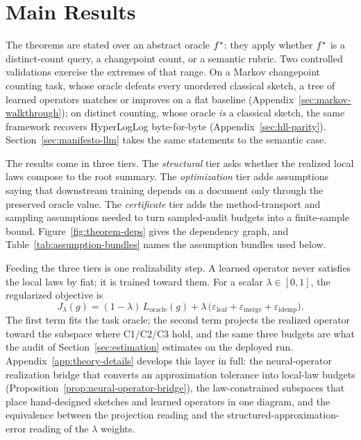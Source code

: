 \section{Main Results}\label{sec:theorems}

The theorems are stated over an abstract oracle $f^\ast$: they apply
whether $f^\ast$ is a distinct-count query, a changepoint count, or a
semantic rubric. Two controlled validations exercise the extremes of
that range. On a Markov changepoint counting task, whose oracle defeats
every unordered classical sketch, a tree of learned operators matches or
improves on a flat baseline (Appendix~\ref{sec:markov-walkthrough}); on
distinct counting, whose oracle \emph{is} a classical sketch, the same
framework recovers HyperLogLog byte-for-byte
(Appendix~\ref{sec:hll-parity}). Section~\ref{sec:manifesto-llm} takes
the same statements to the semantic case.

The results come in three tiers. The \emph{structural} tier asks
whether the realized local laws compose to the root summary. The
\emph{optimization} tier adds assumptions saying that downstream
training depends on a document only through the preserved oracle value.
The \emph{certificate} tier adds the method-transport and sampling
assumptions needed to turn sampled-audit budgets into a finite-sample
bound. Figure~\ref{fig:theorem-deps} gives the dependency graph, and
Table~\ref{tab:assumption-bundles} names the assumption bundles used
below.

Feeding the three tiers is one realizability step. A learned operator
never satisfies the local laws by fiat; it is trained toward them. For
a scalar $\lambda\in[0,1]$, the regularized objective is
\begin{equation}\label{eq:oracle-projection-objective}
J_\lambda(g)
  =
  (1-\lambda)\,L_{\mathrm{oracle}}(g)
  +
  \lambda\,\big(
    \varepsilon_{\mathrm{leaf}}
    + \varepsilon_{\mathrm{merge}}
    + \varepsilon_{\mathrm{idemp}}
  \big).
\end{equation}
The first term fits the task oracle; the second term projects the
realized operator toward the subspace where C1/C2/C3 hold, and the
same three budgets are what the audit of Section~\ref{sec:estimation}
estimates on the deployed run. Appendix~\ref{app:theory-details}
develops this layer in full: the neural-operator realization bridge
that converts an approximation tolerance into local-law budgets
(Proposition~\ref{prop:neural-operator-bridge}), the law-constrained
subspaces that place hand-designed sketches and learned operators in
one diagram, and the equivalence between the projection reading and
the structured-approximation-error reading of the $\lambda$ weights.

